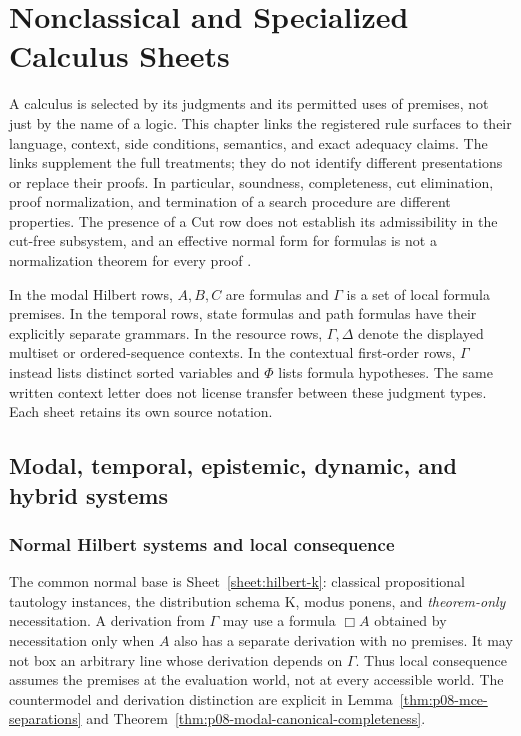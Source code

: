 \chapter{Nonclassical and Specialized Calculus Sheets}
\label{sec:p14-nonclassical-and-specialized-calculi}

A calculus is selected by its judgments and its permitted uses of premises,
not just by the name of a logic.  This chapter links the registered rule
surfaces to their language, context, side conditions, semantics, and exact
adequacy claims.  The links supplement the full treatments; they do not
identify different presentations or replace their proofs.  In particular,
soundness, completeness, cut elimination, proof normalization, and termination
of a search procedure are different properties.  The presence of a Cut row
does not establish its admissibility in the cut-free subsystem, and an
effective normal form for formulas is not a normalization theorem for every
proof \cite{Avron1996,Negri2005,DunnRestall2002,Pitts1995Draft}.

In the modal Hilbert rows, \(A,B,C\) are formulas and \(\Gamma\) is a set of
local formula premises.  In the temporal rows, state formulas and path
formulas have their explicitly separate grammars.  In the resource rows,
\(\Gamma,\Delta\) denote the displayed multiset or ordered-sequence
contexts.  In the contextual first-order rows, \(\Gamma\) instead lists
distinct sorted variables and \(\Phi\) lists formula hypotheses.  The same
written context letter does not license transfer between these judgment
types.  Each sheet retains its own source notation.

\section{Modal, temporal, epistemic, dynamic, and hybrid systems}
\label{sec:p14-nonclassical-modal-temporal}

\subsection{Normal Hilbert systems and local consequence}

The common normal base is Sheet~\ref{sheet:hilbert-k}: classical propositional
tautology instances, the distribution schema K, modus ponens, and
\emph{theorem-only} necessitation.  A derivation from \(\Gamma\) may use a
formula \(\Box A\) obtained by necessitation only when \(A\) also has a
separate derivation with no premises.  It may not box an arbitrary line whose
derivation depends on \(\Gamma\).  Thus local consequence assumes the
premises at the evaluation world, not at every accessible world.  The
countermodel and derivation distinction are explicit in
Lemma~\ref{thm:p08-mce-separations} and
Theorem~\ref{thm:p08-modal-canonical-completeness}.

